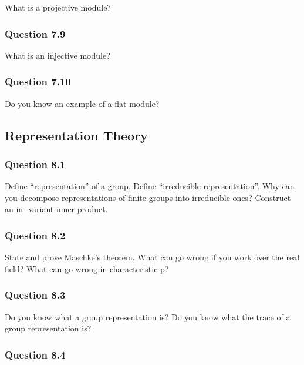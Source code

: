 What is a projective module?

\hypertarget{question-7.9}{%
\subsubsection{Question 7.9}\label{question-7.9}}

What is an injective module?

\hypertarget{question-7.10}{%
\subsubsection{Question 7.10}\label{question-7.10}}

Do you know an example of a flat module?

\hypertarget{representation-theory}{%
\subsection{Representation Theory}\label{representation-theory}}

\hypertarget{question-8.1}{%
\subsubsection{Question 8.1}\label{question-8.1}}

Define ``representation'' of a group. Define ``irreducible
representation''. Why can you decompose representations of finite groups
into irreducible ones? Construct an in- variant inner product.

\hypertarget{question-8.2}{%
\subsubsection{Question 8.2}\label{question-8.2}}

State and prove Maschke's theorem. What can go wrong if you work over
the real field? What can go wrong in characteristic p?

\hypertarget{question-8.3}{%
\subsubsection{Question 8.3}\label{question-8.3}}

Do you know what a group representation is? Do you know what the trace
of a group representation is?

\hypertarget{question-8.4}{%
\subsubsection{Question 8.4}\label{question-8.4}}

